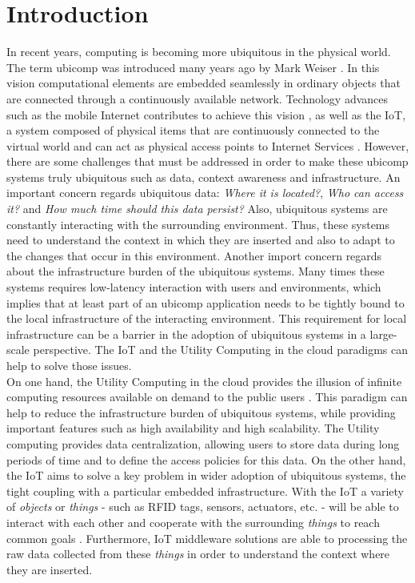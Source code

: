 
\chapter{Introduction}
\label{chapter:introduction}
In recent years, computing is becoming more ubiquitous in the physical world. The term \gls{ubicomp}
was introduced many years ago by Mark Weiser \cite{weiser1991computer}. In this vision computational elements
are embedded seamlessly in ordinary objects that are connected through a continuously available network.
Technology advances such as the mobile Internet contributes to achieve this vision \cite{gubbi2013internet},
as well as the \gls{IoT}, a system composed of physical items that are continuously connected
to the virtual world and can act as physical access points to Internet Services \cite{mattern2010internet}.
However, there are some challenges that must be addressed in order to make these \gls{ubicomp} systems truly
ubiquitous \cite{caceres2012ubicomp} such as data, context awareness and infrastructure. An important
concern regards ubiquitous data: \textit{Where it is located?}, \textit{Who can access it?} and
\textit{How much time should this data persist?} Also, ubiquitous systems are constantly interacting
with the surrounding environment. Thus, these systems need to understand the context in which they are
inserted and also to adapt to the changes that occur in this environment. Another import concern regards
about the infrastructure burden of the ubiquitous systems. Many times these systems requires low-latency
interaction with users and environments, which implies that at least part of an \gls{ubicomp} application
needs to be tightly bound to the local infrastructure of the interacting environment. This requirement
for local infrastructure can be a barrier in the adoption of ubiquitous systems in a large-scale
perspective. The \gls{IoT} and the Utility Computing in the cloud paradigms can help to solve those
issues.\\

On one hand, the Utility Computing in the cloud provides the illusion of infinite computing resources
available on demand to the public users \cite{armbrust2010view}. This paradigm can help to reduce the
infrastructure burden of ubiquitous systems, while providing important features such as high availability
and high scalability. The Utility computing provides data centralization, allowing users
to store data during long periods of time and to define the access policies for this data.
%
On the other hand, the \gls{IoT} aims to solve a key problem in wider adoption of ubiquitous systems,
the tight coupling with a particular embedded infrastructure. With the \gls{IoT} a variety of
\textit{objects} or \textit{things} - such as \gls{RFID} tags, sensors, actuators, etc. - will be
able to interact with each other and cooperate with the surrounding \textit{things} to reach common
goals \cite{atzori2010internet}. Furthermore, \gls{IoT} middleware solutions are able to processing
the raw data collected from these \textit{things} in order to understand the context where they
are inserted.\\

